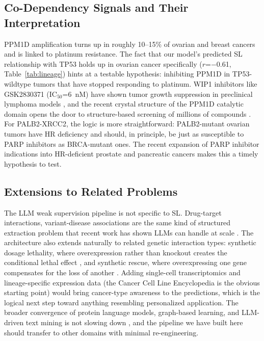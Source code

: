 \documentclass[12pt,a4paper]{article}
\begin{document}
\subsection{Co-Dependency Signals and Their Interpretation}

PPM1D amplification turns up in roughly 10--15\% of ovarian and breast cancers and is linked to platinum resistance. The fact that our model's predicted SL relationship with TP53 holds up in ovarian cancer specifically ($r$=$-$0.61, Table~\ref{tab:lineage}) hints at a testable hypothesis: inhibiting PPM1D in TP53-wildtype tumors that have stopped responding to platinum. WIP1 inhibitors like GSK2830371 (IC$_{50}$=6~nM) have shown tumor growth suppression in preclinical lymphoma models \cite{gilmartin2014}, and the recent crystal structure of the PPM1D catalytic domain opens the door to structure-based screening of millions of compounds \cite{kumar2025}. For PALB2-XRCC2, the logic is more straightforward: PALB2-mutant ovarian tumors have HR deficiency and should, in principle, be just as susceptible to PARP inhibitors as BRCA-mutant ones. The recent expansion of PARP inhibitor indications into HR-deficient prostate and pancreatic cancers \cite{mateo2020} makes this a timely hypothesis to test.

\subsection{Extensions to Related Problems}

The LLM weak supervision pipeline is not specific to SL. Drug-target interactions, variant-disease associations are the same kind of structured extraction problem that recent work has shown LLMs can handle at scale \cite{wang2024,seekpcmdb2025,karma2025}. The architecture also extends naturally to related genetic interaction types: synthetic dosage lethality, where overexpression rather than knockout creates the conditional lethal effect \cite{megchelenbrink2015}, and synthetic rescue, where overexpressing one gene compensates for the loss of another \cite{vanleeuwen2020}. Adding single-cell transcriptomics and lineage-specific expression data (the Cancer Cell Line Encyclopedia \cite{barretina2012} is the obvious starting point) would bring cancer-type awareness to the predictions, which is the logical next step toward anything resembling personalized application. The broader convergence of protein language models, graph-based learning, and LLM-driven text mining is not slowing down \cite{theodoris2023}, and the pipeline we have built here should transfer to other domains with minimal re-engineering.
\end{document}
